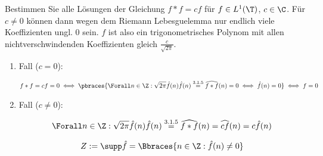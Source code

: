 
\begin{exercise}

Bestimmen Sie alle Lösungen der Gleichung $f \ast f = c f$ für $f \in L^1(\T)$, $c \in \C$.
Für $c \neq 0$ können dann wegen dem Riemann Lebesguelemma nur endlich viele Koeffizienten ungl. 0 sein.
$f$ ist also ein trigonometrisches Polynom mit allen nichtverschwindenden Koeffizienten gleich $\frac{c}{\sqrt{2 \pi}}$.

\end{exercise}


\begin{solution}

\phantom{}

\begin{enumerate}[label = \arabic*.]

    \item Fall ($c = 0$):
    

    \begin{align*}
        f \ast f = c f = 0
        \iff
        \pbraces
        {
            \Forall n \in \Z:
            \sqrt{2 \pi} \hat f(n) \hat f(n) \stackrel{\mathrm{3.1.5}}{=} \widehat{f \ast f}(n) = 0
            \iff
            \hat f(n) = 0    
        }
        \iff
        f = 0
    \end{align*}

    \item Fall ($c \neq 0$):
    
    \begin{align*}
        \Forall n \in \Z:
        \sqrt{2 \pi} \hat f(n) \hat f(n)
        \stackrel{
            \mathrm{3.1.5}
        }{=}
        \widehat{f \ast f}(n)
        =
        \widehat{c f}(n)
        =
        c \hat f(n)
    \end{align*}

    \begin{align*}
        Z
        :=
        \supp \hat f
        =
        \Bbraces{n \in \Z: \hat f(n) \neq 0}
    \end{align*}


\end{enumerate}
\end{solution}
